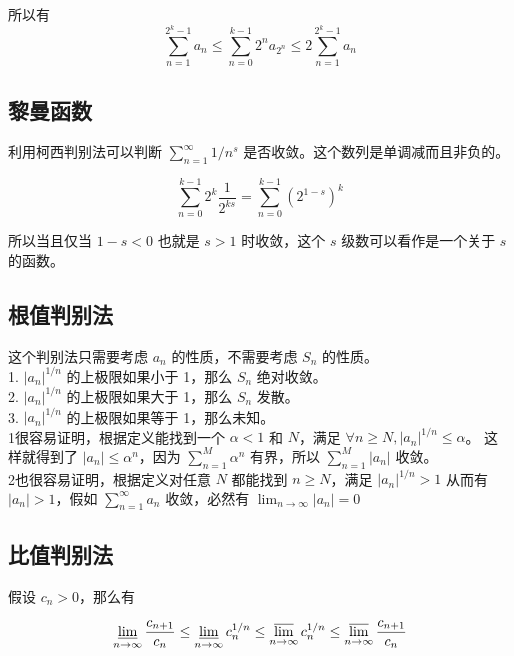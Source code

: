 所以有  \\

\[ \sum_{n=1}^{2^k-1}a_n \le \sum_{n=0}^{k-1}2^na_{2^n} \le 2\sum_{n=1}^{2^k-1}a_n \]

\subsection{黎曼函数}

利用柯西判别法可以判断 $\sum_{n=1}^{\infty}1/n^s$ 是否收敛。这个数列是单调减而且非负的。

\[ \sum_{n=0}^{k-1}2^k\frac{1}{2^{ks}} = \sum_{n=0}^{k-1}(2^{1-s})^k \]

所以当且仅当 $1-s < 0$ 也就是 $s > 1$ 时收敛，这个 $s$ 级数可以看作是一个关于 $s$ 的函数。


\subsection{根值判别法}
这个判别法只需要考虑 $a_n$ 的性质，不需要考虑 $S_n$ 的性质。\\

1. $\lvert a_n \rvert ^{1/n}$ 的上极限如果小于 1，那么 $S_n$ 绝对收敛。 \\

2. $\lvert a_n \rvert ^{1/n}$ 的上极限如果大于 1，那么 $S_n$ 发散。 \\

3. $\lvert a_n \rvert ^{1/n}$ 的上极限如果等于 1，那么未知。 \\

1很容易证明，根据定义能找到一个 $ \alpha < 1 $ 和 $N$，满足 $\forall n \ge N, \lvert a_n \rvert ^{1/n} \le \alpha $。
这样就得到了 $\lvert a_n \rvert \le \alpha ^n$，因为 $\sum_{n=1}^{M}\alpha^n$ 有界，所以 $\sum_{n=1}^{M}\lvert a_n \rvert $ 收敛。 \\

2也很容易证明，根据定义对任意 $N$ 都能找到 $n \ge N$，满足 $\lvert a_n \rvert ^{1/n} > 1$ 从而有 $\lvert a_n \rvert > 1$，假如 $\sum_{n=1}^{\infty}a_n$ 收敛，必然有 $\lim_{n \to \infty}\lvert a_n \rvert = 0$


\subsection{比值判别法}

假设 $c_n > 0$，那么有

\begin{align*}
\varliminf_{n \to \infty}\frac{c_{n+1}}{c_n} \le \varliminf_{n \to \infty} c_n ^{1/n} \le \varlimsup_{n \to \infty} c_n ^{1/n} \le \varlimsup_{n \to \infty} \frac{c_{n+1}}{c_n}
\end{align*}

